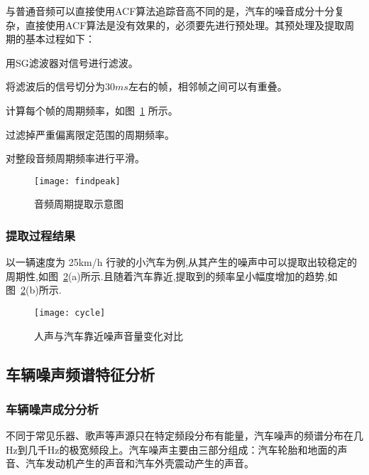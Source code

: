 与普通音频可以直接使用ACF算法追踪音高不同的是，汽车的噪音成分十分复杂，直接使用ACF算法是没有效果的，必须要先进行预处理。其预处理及提取周期的基本过程如下：

\begin{compactenum}
\item 用SG滤波器对信号进行滤波。

\item 将滤波后的信号切分为$30ms$左右的帧，相邻帧之间可以有重叠。

\item 计算每个帧的周期频率，如图~\ref{fig:findpeak} 所示。

\item 过滤掉严重偏离限定范围的周期频率。

\item 对整段音频周期频率进行平滑。

\end{compactenum}

\begin{figure}[htbp] %
  \centering
  \texttt{[image: findpeak]}
  \caption{音频周期提取示意图}
  \label{fig:findpeak}
\end{figure}



\subsubsection{提取过程结果}

以一辆速度为 25km/h 行驶的小汽车为例,从其产生的噪声中可以提取出较稳定的周期性,如图~\ref{fig:cycle}(a)所示.且随着汽车靠近,提取到的频率呈小幅度增加的趋势,如图~\ref{fig:cycle}(b)所示. 

\begin{figure}[htbp] %
  \centering
  \texttt{[image: cycle]}
  \caption[音量变化特性对比]{人声与汽车靠近噪声音量变化对比}
  \label{fig:cycle}
\end{figure}



\subsection{车辆噪声频谱特征分析}

\subsubsection{车辆噪声成分分析}
不同于常见乐器、歌声等声源只在特定频段分布有能量，汽车噪声的频谱分布在几Hz到几千Hz的极宽频段上。汽车噪声主要由三部分组成：汽车轮胎和地面的声音、汽车发动机产生的声音和汽车外壳震动产生的声音。

